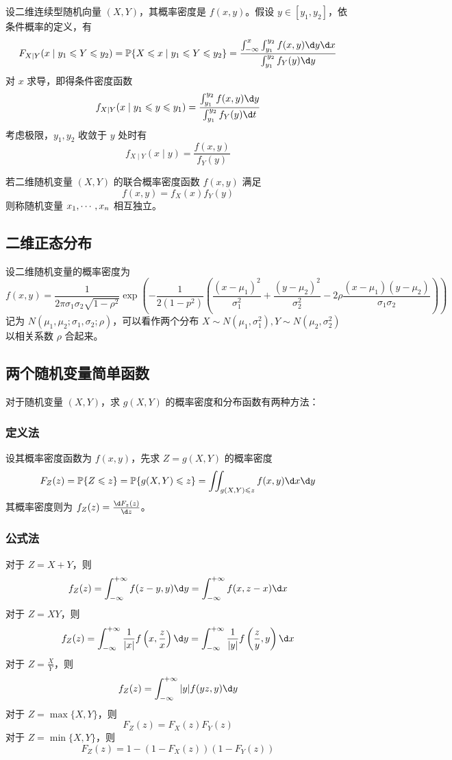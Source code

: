 设二维连续型随机向量 $(X, Y)$，其概率密度是 $f(x, y)$。假设 $y \in [y_1, y_2]$，依条件概率的定义，有
\[ F_{X|Y}(x \mid y_1 \leqslant Y \leqslant y_2) = \bbP\{X \leqslant x \mid y_1 \leqslant Y \leqslant y_2\} = \frac{\int_{-\infty}^x \int_{y_1}^{y_2} f(x, y) \d y \d x }{\int_{y_1}^{y_2} f_Y(y) \d y }\]
对 $x$ 求导，即得条件密度函数
\[ f_{X \mid Y}(x \mid y_1 \leqslant y \leqslant y_1) = \frac{\int_{y_1}^{y_2} f(x, y) \d y}{\int_{y_1}^{y_2} f_{Y}(y) \d t} \]
考虑极限，$y_1, y_2$ 收敛于 $y$ 处时有
\[ f_{X \mid Y}(x \mid y) = \frac{f(x, y)}{f_{Y}(y)} \]

若二维随机变量 $(X,Y)$ 的联合概率密度函数 $f(x,y)$ 满足
\[ f(x,y) = f_{X}(x) f_{Y}(y) \]
则称随机变量 $x_1,\cdots,x_n$ 相互独立。

\subsection{二维正态分布}

设二维随机变量的概率密度为
\[ f(x, y) = \frac{1}{2 \pi \sigma_1 \sigma_2 \sqrt{1 - \rho^2}} \exp \left( -\frac{1}{2(1-p^2)} \left(\frac{(x-\mu_1)^2}{\sigma_1^2} + \frac{(y-\mu_2)^2}{\sigma_2^2} - 2 \rho\frac{(x-\mu_1)(y-\mu_2)}{\sigma_1 \sigma_2}\right) \right) \]
记为 $N(\mu_1, \mu_2; \sigma_1, \sigma_2; \rho)$，可以看作两个分布 $X \sim N(\mu_1, \sigma_1^2), Y \sim N(\mu_2, \sigma_2^2)$ 以相关系数 $\rho$ 合起来。

\subsection{两个随机变量简单函数}

对于随机变量 $(X, Y)$，求 $g(X, Y)$ 的概率密度和分布函数有两种方法：

\subsubsection*{定义法}

设其概率密度函数为 $f(x, y)$，先求 $Z = g(X, Y)$ 的概率密度
\[ F_Z(z) = \bbP\{Z \leqslant z\} = \bbP\{g(X,Y) \leqslant z\} = \iint_{g(X,Y) \leqslant z} f(x, y) \d x \d y \]
其概率密度则为 $f_Z(z) = \frac{\d F_z(z)}{\d z}$。

\subsubsection*{公式法}

对于 $Z = X + Y$，则
\[ f_Z(z) = \int_{-\infty}^{+\infty} f(z - y, y) \d y = \int_{-\infty}^{+\infty} f(x, z - x) \d x \]
对于 $Z = XY$，则
\[ f_Z(z) = \int_{-\infty}^{+\infty} \frac{1}{|x|}f\left(x, \frac{z}{x}\right) \d y = \int_{-\infty}^{+\infty} \frac{1}{|y|}f\left(\frac{z}{y}, y\right) \d x \]
对于 $Z = \frac{X}{Y}$，则
\[ f_Z(z) = \int_{-\infty}^{+\infty} |y|f(yz, y) \d y \]
对于 $Z = \max\{X, Y\}$，则
\[ F_Z(z) = F_X(z)F_Y(z) \]
对于 $Z = \min\{X, Y\}$，则
\[ F_Z(z) = 1 - (1 - F_X(z))(1 - F_Y(z)) \]

